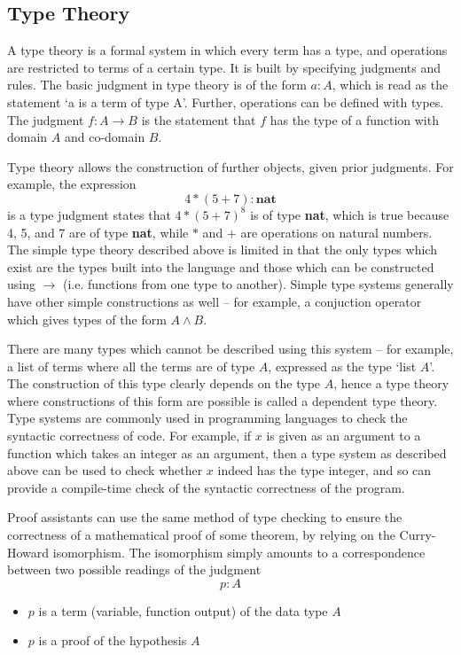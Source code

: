 \documentclass[runningheads,a4paper]{llncs}
\renewcommand{\-}{\setminus}
\begin{document}
\subsection{Type Theory}

A type theory is a formal system in which every term has a type, and operations are restricted to terms of a certain type. It is built by specifying judgments and rules. The basic judgment in type theory is of the form $a : A$, which is read as the statement `a is a term of type A'. Further, operations can be defined with types. The judgment $f : A \to B$ is the statement that $f$ has the type of a function with domain $A$ and co-domain $B$.

Type theory allows the construction of further objects, given prior judgments. For example, the expression
\[
4 * (5 + 7) : \textbf{nat}
\]
is a type judgment states that $4 * (5 + 7)^8$ is of type \textbf{nat}, which is true because 4, 5, and 7 are of type \textbf{nat}, while $*$ and $+$ are operations on natural numbers.\\

The simple type theory described above is limited in that the only types which exist are the types built into the language and those which can be constructed using $\to$ (i.e. functions from one type to another). Simple type systems generally have other simple constructions as well -- for example, a conjuction operator which gives types of the form $A \land B$.

There are many types which cannot be described using this system -- for example, a list of terms where all the terms are of type $A$, expressed as the type `list $A$'. The construction of this type clearly depends on the type $A$, hence a type theory where constructions of this form are possible is called a dependent type theory.\\

Type systems are commonly used in programming languages to check the syntactic correctness of code. For example, if $x$ is given as an argument to a function which takes an integer as an argument, then a type system as described above can be used to check whether $x$ indeed has the type integer, and so can provide a compile-time check of the syntactic correctness of the program.

Proof assistants can use the same method of type checking to ensure the correctness of a mathematical proof of some theorem, by relying on the Curry-Howard isomorphism. The isomorphism simply amounts to a correspondence between two possible readings of the judgment
\[
p : A
\]
\begin{itemize}
\item $p$ is a term (variable, function output) of the data type $A$
\item $p$ is a proof of the hypothesis $A$
\end{itemize}
\end{document}
